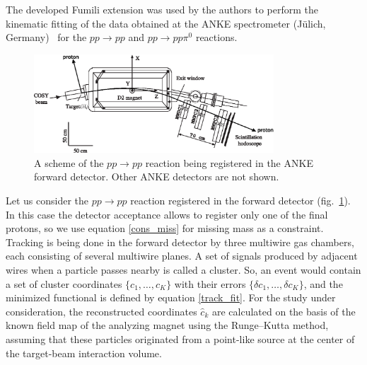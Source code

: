 The developed Fumili extension was used by the authors to perform the kinematic fitting of the data obtained at the ANKE spectrometer (Jülich, Germany)~\cite{anke} for the $pp \to pp$ and $pp \to pp\pi^0$ reactions.


\begin{figure}[htbp]\centering
\includegraphics[width=0.8\textwidth]{pics/setup_bw.eps}
\caption{
A scheme of the $pp \to pp$ reaction being registered in the ANKE forward detector. Other ANKE detectors are not shown.
}
\label{anke_scheme}
\end{figure}

Let us consider the $pp \to pp$ reaction registered in the forward detector (fig.~\ref{anke_scheme}).
In this case the detector acceptance allows to register only one of the final protons, so we use equation \eqref{cons_miss} for missing mass as a constraint.
Tracking is being done in the forward detector by three multiwire gas chambers, each consisting of several multiwire planes.
A set of signals produced by adjacent wires when a particle passes nearby is called a cluster.
So, an event would contain a set of cluster coordinates $\{c_1, \ldots, c_K\}$ with their errors $\{\delta c_1, \ldots, \delta c_K\}$, and the minimized functional is defined by equation \eqref{track_fit}.
For the study under consideration, the reconstructed coordinates $\hat{c}_k$ are calculated on the basis of the known field map of the analyzing magnet using the Runge–Kutta method, assuming that these particles originated from a point-like source at the center of the target-beam interaction volume.

